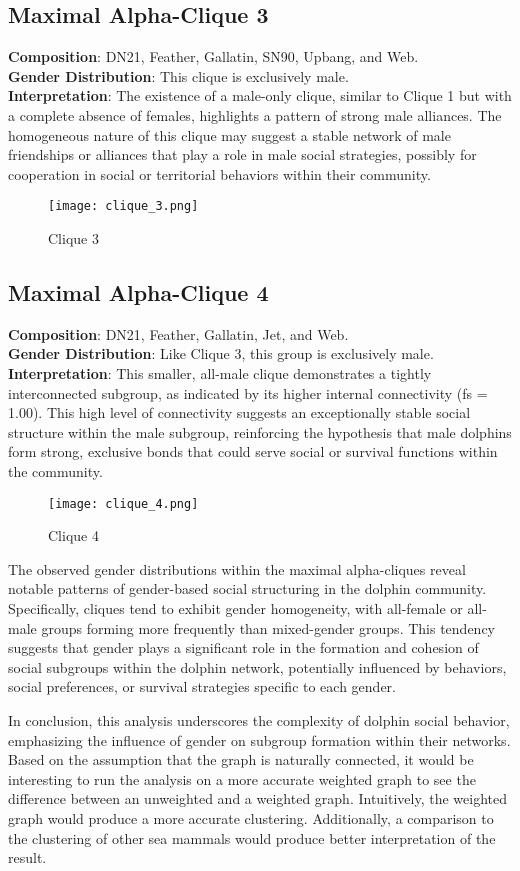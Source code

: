 \subsection{Maximal Alpha-Clique 3}
\textbf{Composition}: DN21, Feather, Gallatin, SN90, Upbang, and Web. \\
\textbf{Gender Distribution}: This clique is exclusively male. \\
\textbf{Interpretation}: The existence of a male-only clique, similar to Clique 1 but with a complete absence of females, highlights a pattern of strong male alliances. The homogeneous nature of this clique may suggest a stable network of male friendships or alliances that play a role in male social strategies, possibly for cooperation in social or territorial behaviors within their community.
\begin{figure}[H]
    \centering
    \texttt{[image: clique\_3.png]}
    \caption{Clique 3}
    \label{fig:clique_3}
\end{figure}

\subsection{Maximal Alpha-Clique 4}
\textbf{Composition}: DN21, Feather, Gallatin, Jet, and Web. \\
\textbf{Gender Distribution}: Like Clique 3, this group is exclusively male. \\
\textbf{Interpretation}: This smaller, all-male clique demonstrates a tightly interconnected subgroup, as indicated by its higher internal connectivity (fs = 1.00). This high level of connectivity suggests an exceptionally stable social structure within the male subgroup, reinforcing the hypothesis that male dolphins form strong, exclusive bonds that could serve social or survival functions within the community.
\begin{figure}[H]
    \centering
    \texttt{[image: clique\_4.png]}
    \caption{Clique 4}
    \label{fig:clique_4}
\end{figure}

The observed gender distributions within the maximal alpha-cliques reveal notable patterns of gender-based social structuring in the dolphin community. Specifically, cliques tend to exhibit gender homogeneity, with all-female or all-male groups forming more frequently than mixed-gender groups. This tendency suggests that gender plays a significant role in the formation and cohesion of social subgroups within the dolphin network, potentially influenced by behaviors, social preferences, or survival strategies specific to each gender.

In conclusion, this analysis underscores the complexity of dolphin social behavior, emphasizing the influence of gender on subgroup formation within their networks. Based on the assumption that the graph is naturally connected, it would be interesting to run the analysis on a more accurate weighted graph to see the difference between an unweighted and a weighted graph. Intuitively, the weighted graph would produce a more accurate clustering. Additionally, a comparison to the clustering of other sea mammals would produce better interpretation of the result.
